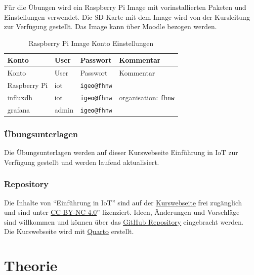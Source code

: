\documentclass[
  11pt,
  a4paperpaper,
  oneside, openany  ,captions=tableheading
]{scrbook}
\theoremstyle{definition}
\theoremstyle{remark}
\renewcommand{\markright}[1]{\def\chaptertitle{#1}} %
\begin{document}
\markright{Raspberry Pi Image Kontoinformationen}

Für die Übungen wird ein Raspberry Pi Image mit vorinstallierten Paketen
und Einstellungen verwendet. Die SD-Karte mit dem Image wird von der
Kursleitung zur Verfügung gestellt. Das Image kann über Moodle bezogen
werden.

\begin{longtable}[]{@{}llll@{}}
\caption{Raspberry Pi Image Konto Einstellungen}\tabularnewline
\toprule\noalign{}
Konto & User & Passwort & Kommentar \\
\midrule\noalign{}
\endfirsthead
\toprule\noalign{}
Konto & User & Passwort & Kommentar \\
\midrule\noalign{}
\endhead
\bottomrule\noalign{}
\endlastfoot
Raspberry Pi & iot & \texttt{igeo@fhnw} & \\
influxdb & iot & \texttt{igeo@fhnw} & organisation: \texttt{fhnw} \\
grafana & admin & \texttt{igeo@fhnw} & \\
\end{longtable}

\section*{Übungsunterlagen}\label{uxfcbungsunterlagen}

\markright{Übungsunterlagen}

Die Übungsunterlagen werden auf dieser Kurswebseite Einführung in IoT
zur Verfügung gestellt und werden laufend aktualisiert.

\section*{Repository}\label{repository}

\markright{Repository}

Die Inhalte von ``Einführung in IoT'' sind auf der
\href{https://314a.github.io/5200_IoT}{Kurswebseite} frei zugänglich und
sind unter \href{https://creativecommons.org/licenses/by-nc/4.0/}{CC
BY-NC 4.0}'' lizenziert. Ideen, Änderungen und Vorschläge sind
willkommen und können über das
\href{https://github.com/314a/5200_IoT}{GitHub Repository} eingebracht
werden. Die Kurswebseite wird mit \href{https://quarto.org/}{Quarto}
erstellt.

\part{Theorie}
\end{document}
